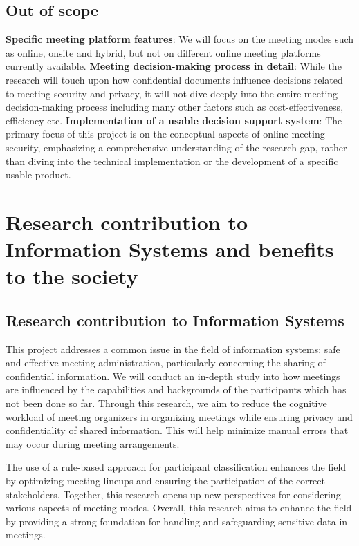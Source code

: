 \begin{spacing}{1.0}
    \subsection{Out of scope}
    \textbf{Specific meeting platform features}: We will focus on the meeting modes such as online, onsite and hybrid, but not on different online meeting platforms currently available.
    \newline\newline \textbf{Meeting decision-making process in detail}: While the research will touch upon how confidential documents influence decisions related to meeting security and privacy, it will not dive deeply into the entire meeting decision-making process including many other factors such as cost-effectiveness, efficiency etc.
    \newline\newline \textbf{Implementation of a usable decision support system}: The primary focus of this project is on the conceptual aspects of online meeting security, emphasizing a comprehensive understanding of the research gap, rather than diving into the technical implementation or the development of a specific usable product.


    \section{Research contribution to Information Systems and benefits to the society}

    \subsection{Research contribution to Information Systems}
    \indent \par This project addresses a common issue in the field of information systems: safe and effective meeting administration, particularly concerning the sharing of confidential information. We will conduct an in-depth study into how meetings are influenced by the capabilities and backgrounds of the participants which has not been done so far. Through this research, we aim to reduce the cognitive workload of meeting organizers in organizing meetings while ensuring privacy and confidentiality of shared information. This will help minimize manual errors that may occur during meeting arrangements.
    \par The use of a rule-based approach for participant classification enhances the field by optimizing meeting lineups and ensuring the participation of the correct stakeholders. Together, this research opens up new perspectives for considering various aspects of meeting modes. Overall, this research aims to enhance the field by providing a strong foundation for handling and safeguarding sensitive data in meetings.
    

\end{spacing}

